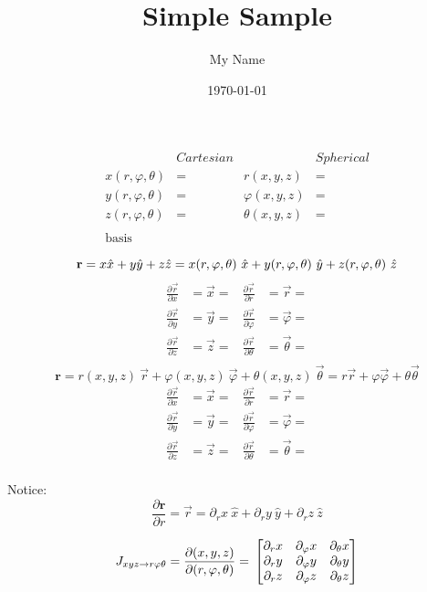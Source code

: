 \documentclass{article} %
\title{Simple Sample} %
\author{My Name} %
\date{\today} %
\begin{document}
\maketitle %

\begin{align*}
&Cartesian                      &               &Spherical\\
x(r, \varphi, \theta)&=           &r(x,y,z)&=\\
y(r, \varphi, \theta)&=           &\varphi(x,y,z)&=\\
z(r, \varphi, \theta)&=           &\theta(x,y,z)&=\\
\\
\text{basis}\\
\end{align*}
$$\mathbf{r} = x\hat{x} + y\hat{y} +z\hat{z}  
= x(r, \varphi, \theta)\ \hat{x} +y(r, \varphi, \theta)\ \hat{y} +z(r, \varphi, \theta)\ \hat{z}\\$$
\begin{align*}
\frac{\partial \vec{r}}{\partial x}&=\vec{x}=     &\frac{\partial \vec{r}}{\partial r}&=\vec{r}=\\
\frac{\partial \vec{r}}{\partial y}&=\vec{y}=     &\frac{\partial \vec{r}}{\partial \varphi}&=\vec{\varphi}=\\
\frac{\partial \vec{r}}{\partial z}&=\vec{z}=     &\frac{\partial \vec{r}}{\partial \theta}&=\vec{\theta}=\\
\end{align*}
$$\mathbf{r} = r(x,y,z)\ \vec{r} + \varphi(x,y,z)\ \vec{\varphi} + \theta(x,y,z)\ \vec{\theta}
=r\vec{r} + \varphi \vec{\varphi} + \theta \vec{\theta}$$
\begin{align*}
\frac{\partial \vec{r}}{\partial x}&=\vec{x}=     &\frac{\partial \vec{r}}{\partial r}&=\vec{r}=\\
\frac{\partial \vec{r}}{\partial y}&=\vec{y}=     &\frac{\partial \vec{r}}{\partial \varphi}&=\vec{\varphi}=\\
\frac{\partial \vec{r}}{\partial z}&=\vec{z}=     &\frac{\partial \vec{r}}{\partial \theta}&=\vec{\theta}=\\
\end{align*}

Notice:
$$\frac{\partial \mathbf{r}}{\partial r} = \vec{r} = \partial_r x \ \hat{x} + \partial_r y \ \hat{y} + \partial_r z \ \hat{z}$$

\[
J_{xyz \rightarrow r \varphi \theta} =
\frac{\partial(x,y,z)}{\partial(r, \varphi, \theta)} =\\
\begin{bmatrix}
\partial_r x & \partial_{\varphi} x & \partial_{\theta} x\\
\partial_r y & \partial_{\varphi} y & \partial_{\theta} y\\
\partial_r z & \partial_{\varphi} z & \partial_{\theta} z\\
\end{bmatrix}
\]
\end{document}
